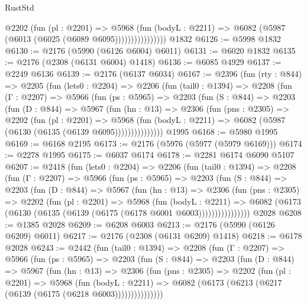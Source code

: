 \begin{lexlean}{RustStd}
\begin{coremodule}
{\begin{coremodule}
{{{{{{{{{{                      @2202
                        (fun (pl : @2201) =>
                        @5968
                          (fun (bodyL : @2211) =>
                          @6082 (@5987 (@6013 (@6025 (@6089 @6095))))))))))))))))
    @1832
@6126 := @5998 @1832
@6130 := @2176 (@5990 (@6126 @6004) @6011)
@6131 := @6020 @1832
@6135 := @2176 (@2308 (@6131 @6004) @1418)
@6136 := @6085 @4929
@6137 := @2249 @6136
@6139 := @2176 (@6137 @6034)
@6167 := @2396
    (fun (rty : @844) =>
    @2205
      (fun (lets0 : @2204) =>
      @2206
        (fun (tail0 : @1394) =>
        @2208
          (fun (Γ : @2207) =>
          @5966
            (fun (ps : @5965) =>
            @2203
              (fun (S : @844) =>
              @2203
                (fun (D : @844) =>
                @5967
                  (fun (hn : @13) =>
                  @2306
                    (fun (pns : @2305) =>
                    @2202
                      (fun (pl : @2201) =>
                      @5968
                        (fun (bodyL : @2211) =>
                        @6082 (@5987 (@6130 (@6135 (@6139 @6095)))))))))))))))
    @1995
@6168 := @5980 @1995
@6169 := @6168 @2195
@6173 := @2176 (@5976 (@5977 (@5979 @6169)))
@6174 := @2278 @1995
@6175 := @6037 @6174
@6178 := @2281 @6174 @6090 @5107
@6207 := @2418
    (fun (lets0 : @2204) =>
    @2206
      (fun (tail0 : @1394) =>
      @2208
        (fun (Γ : @2207) =>
        @5966
          (fun (ps : @5965) =>
          @2203
            (fun (S : @844) =>
            @2203
              (fun (D : @844) =>
              @5967
                (fun (hn : @13) =>
                @2306
                  (fun (pns : @2305) =>
                  @2202
                    (fun (pl : @2201) =>
                    @5968
                      (fun (bodyL : @2211) =>
                      @6082 (@6173 (@6130 (@6135 (@6139 (@6175 (@6178 @6001 @6003))))))))))))))))
    @2028
@6208 := @1385 @2028
@6209 := @6208 @6003
@6213 := @2176 (@5990 (@6126 @6209) @6011)
@6217 := @2176 (@2308 (@6131 @6209) @1418)
@6218 := @6178 @2028
@6243 := @2442
    (fun (tail0 : @1394) =>
    @2208
      (fun (Γ : @2207) =>
      @5966
        (fun (ps : @5965) =>
        @2203
          (fun (S : @844) =>
          @2203
            (fun (D : @844) =>
            @5967
              (fun (hn : @13) =>
              @2306
                (fun (pns : @2305) =>
                @2202
                  (fun (pl : @2201) =>
                  @5968
                    (fun (bodyL : @2211) =>
                    @6082 (@6173 (@6213 (@6217 (@6139 (@6175 (@6218 @6003)))))))))))))))
}}}}}}}}}}
\end{coremodule}}
\end{coremodule}
\end{lexlean}

